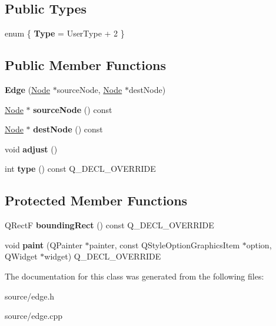 \subsection*{Public Types}
\begin{DoxyCompactItemize}
\item 
\hypertarget{classEdge_a1076c24a9c10f5e019ee362060200329}{}enum \{ {\bfseries Type} = User\+Type + 2
 \}\label{classEdge_a1076c24a9c10f5e019ee362060200329}

\end{DoxyCompactItemize}
\subsection*{Public Member Functions}
\begin{DoxyCompactItemize}
\item 
\hypertarget{classEdge_a2d28ba5ca3502b2134f7d2587e57cae7}{}{\bfseries Edge} (\hyperlink{classNode}{Node} $\ast$source\+Node, \hyperlink{classNode}{Node} $\ast$dest\+Node)\label{classEdge_a2d28ba5ca3502b2134f7d2587e57cae7}

\item 
\hypertarget{classEdge_abd81ba4644f7453ede7f74f442a4c943}{}\hyperlink{classNode}{Node} $\ast$ {\bfseries source\+Node} () const \label{classEdge_abd81ba4644f7453ede7f74f442a4c943}

\item 
\hypertarget{classEdge_a1b844ad6fd91e53003a55ed62d184fac}{}\hyperlink{classNode}{Node} $\ast$ {\bfseries dest\+Node} () const \label{classEdge_a1b844ad6fd91e53003a55ed62d184fac}

\item 
\hypertarget{classEdge_ab554a765fd7a57fcdf289aa51b4df328}{}void {\bfseries adjust} ()\label{classEdge_ab554a765fd7a57fcdf289aa51b4df328}

\item 
\hypertarget{classEdge_ad0859f7b8f96e4ab40edb267743b1c08}{}int {\bfseries type} () const Q\+\_\+\+D\+E\+C\+L\+\_\+\+O\+V\+E\+R\+R\+I\+D\+E\label{classEdge_ad0859f7b8f96e4ab40edb267743b1c08}

\end{DoxyCompactItemize}
\subsection*{Protected Member Functions}
\begin{DoxyCompactItemize}
\item 
\hypertarget{classEdge_a02a869b182dfb09f04be5ee3f0ce56dd}{}Q\+Rect\+F {\bfseries bounding\+Rect} () const Q\+\_\+\+D\+E\+C\+L\+\_\+\+O\+V\+E\+R\+R\+I\+D\+E\label{classEdge_a02a869b182dfb09f04be5ee3f0ce56dd}

\item 
\hypertarget{classEdge_a8e9131800530a799730d2f6dbee21187}{}void {\bfseries paint} (Q\+Painter $\ast$painter, const Q\+Style\+Option\+Graphics\+Item $\ast$option, Q\+Widget $\ast$widget) Q\+\_\+\+D\+E\+C\+L\+\_\+\+O\+V\+E\+R\+R\+I\+D\+E\label{classEdge_a8e9131800530a799730d2f6dbee21187}

\end{DoxyCompactItemize}


The documentation for this class was generated from the following files\+:\begin{DoxyCompactItemize}
\item 
source/edge.\+h\item 
source/edge.\+cpp\end{DoxyCompactItemize}

